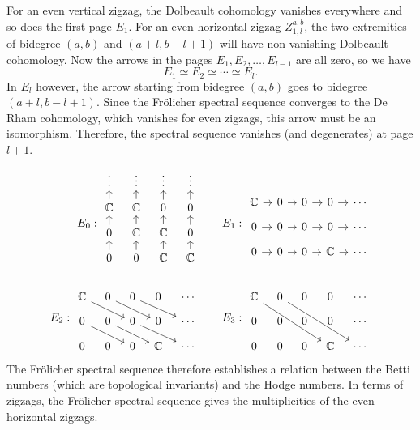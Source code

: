 \documentclass[leqno]{article}
\theoremstyle{definition}
\numberwithin{equation}{section}
\begin{document}
For an even vertical zigzag, the Dolbeault cohomology vanishes everywhere and so does the first page $E_1$. For an even horizontal zigzag $Z^{a, b}_{1, l}$, the two extremities of bidegree $(a, b)$ and $(a+l, b-l+1)$ will have non vanishing Dolbeault cohomology. Now the arrows in the pages $E_1, E_2, \dots, E_{l-1}$ are all zero, so we have
\[
E_1 \simeq E_2 \simeq \cdots \simeq E_{l}.
\]
In $E_l$ however, the arrow starting from bidegree $(a, b)$ goes to bidegree $(a+l, b-l+1)$. Since the Frölicher spectral sequence converges to the De Rham cohomology, which vanishes for even zigzags, this arrow must be an isomorphism. 
Therefore, the spectral sequence vanishes (and degenerates) at page $l+1$.
\[
\aligned
E_0 :
\begin{tikzcd}[row sep=.8em, column sep=.8em, baseline=-1em]
\vdots & \vdots & \vdots & \vdots \\
\mathbb{C} \arrow[u] & \mathbb{C} \arrow[u] & 0 \arrow[u] & 0 \arrow[u]\\
0 \arrow[u] &\mathbb{C} \arrow[u] & \mathbb{C} \arrow[u] & 0 \arrow[u] \\
0 \arrow[u]  & 0 \arrow[u] &\mathbb{C} \arrow[u] & \mathbb{C} \arrow[u] 
\end{tikzcd}
\quad \quad
E_1:
\begin{tikzcd}[row sep=.8em, column sep=.8em]
\mathbb{C} \arrow[r] & 0 \arrow[r] & 0 \arrow[r] & 0 \arrow[r] & \cdots \\
0 \arrow[r] &  0\arrow[r] & 0 \arrow[r] & 0 \arrow[r] & \cdots \\
0 \arrow[r]  & 0 \arrow[r] & 0 \arrow[r] & \mathbb{C} \arrow[r] & \cdots
\end{tikzcd}
\\ \\
E_2:
\begin{tikzcd}[row sep=.8em, column sep=.8em]
\mathbb{C} \arrow[rrd] & 0 \arrow[rrd] & 0 \arrow[rrd] & 0 & \cdots \\
0 \arrow[rrd] &  0\arrow[rrd] & 0 \arrow[rrd] & 0 & \cdots \\
0 & 0 & 0 & \mathbb{C} & \cdots
\end{tikzcd}
\quad \quad
E_3:
\begin{tikzcd}[row sep=.8em, column sep=.8em]
\mathbb{C} \arrow[rrrdd] & 0 \arrow[rrrdd] & 0 & 0 & \cdots \\
0 &  0 & 0 & 0 & \cdots \\
0 & 0 & 0 & \mathbb{C} & \cdots
\end{tikzcd}
\endaligned
\]
The Frölicher spectral sequence therefore establishes a relation between the Betti numbers (which are topological invariants) and the Hodge numbers. In terms of zigzags, the Frölicher spectral sequence gives the multiplicities of the even horizontal zigzags. 
\end{document}
